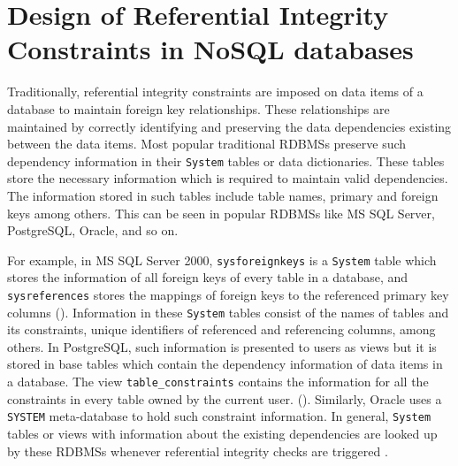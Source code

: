 \chapter{Design of Referential Integrity Constraints in NoSQL
databases} \label{c:solutions}

Traditionally,  referential
integrity constraints are imposed on data items of a database to maintain
foreign key relationships.  These relationships are
 maintained by correctly identifying and preserving the data dependencies 
 existing between the data items. 
Most popular traditional \acp{RDBMS}
preserve such dependency information in their \texttt{System} tables or data
dictionaries.   These tables store the necessary information  which is required
to maintain valid dependencies.  The information stored in such tables include table
names,   primary and foreign keys among others. 
This can be seen in popular \acp{RDBMS} like  MS SQL Server,   PostgreSQL, 
Oracle,  and so on.   

For example,   in MS SQL Server 2000,  \texttt{sysforeignkeys}
is a \texttt{System} table which stores the information of all 
foreign keys of every table in a database,  and \texttt{sysreferences}
stores the mappings of  foreign keys to the referenced primary key columns
(). 
Information in these \texttt{System} tables consist of  the
names of tables and its constraints,   unique identifiers of 
referenced and referencing columns,   among others.  
In PostgreSQL,  such information is presented to users as views but it is stored
in base tables which contain the dependency information of data items in a database.
The view \texttt{table\_constraints} contains the information for all the
constraints in every table owned by the current user.  (\todo{\cite{}}).  
Similarly,  Oracle uses a \texttt{SYSTEM} meta-database to hold such constraint
information. 
 In general,  \texttt{System} tables or views with information
about the existing dependencies  are looked up by these \acp{RDBMS} whenever
referential integrity checks are triggered \citep{sys:msdn}. 


